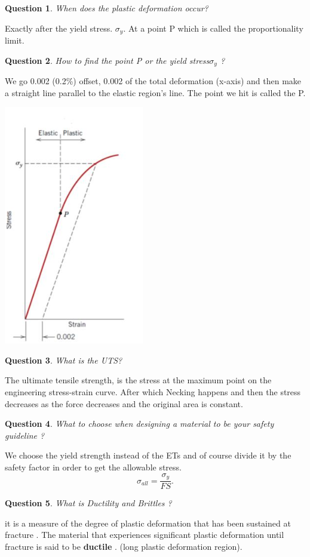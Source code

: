 \documentclass[13]{article}
\newtheorem{exer}{Question}
\begin{document}
\begin{exer}
When does the plastic deformation occur?
\end{exer}
Exactly after the yield stress. $\sigma_y$. At a point P which is called the proportionality limit.
\begin{exer}
	How to find the point P or the yield stress$\sigma_y$ ?
\end{exer}
We go 0.002 (0.2\%) offset, 0.002 of the total deformation (x-axis) and then make a straight line parallel to the elastic region's line. The point we hit is called the P.
\begin{center}
\includegraphics[scale=0.5]{figures/4.png}
\end{center}
\begin{exer}
What is the UTS?
\end{exer}
The ultimate tensile strength, is the stress at the maximum point on the engineering stress-strain curve. After which Necking happens and then the stress decreases as the force decreases and the original area is constant. 
\begin{exer}
What to choose when designing a material to be your safety guideline ?
\end{exer}
We choose the yield strength instead of the ETs and of course divide it by the safety factor in order to get the allowable stress.
\[
	\sigma_{all} = \frac{\sigma_y}{FS} 
.\] 
\begin{exer}
What is Ductility and Brittles ?
\end{exer}
it is a measure of the degree of plastic deformation that has been sustained at fracture . The material that experiences significant plastic deformation until fracture is said to be \textbf{ductile} . (long plastic deformation region).
\end{document}

